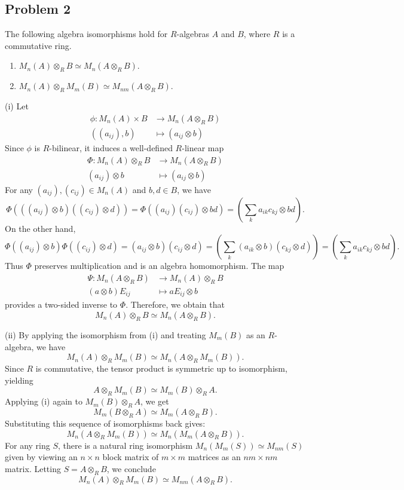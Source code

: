 \subsection*{Problem 2}
The following algebra isomorphisms hold for $R$-algebras $A$ and $B$, where $R$ is a commutative ring.
\begin{enumerate}
    \item[(i)] $M_n(A) \otimes_R B \simeq M_n(A \otimes_R B)$.
    \item[(ii)] $M_n(A) \otimes_R M_m(B) \simeq M_{nm}(A \otimes_R B)$.
\end{enumerate}
\begin{solution}
    (i) Let 
    \begin{align*}
        \phi : M_n(A) \times B &\to M_n(A \otimes_R B)\\
        ((a_{ij}), b)&\mapsto (a_{ij} \otimes b)
    \end{align*}
    Since $\phi$ is $R$-bilinear, it induces a well-defined $R$-linear map 
    \begin{align*}
        \Phi : M_n(A) \otimes_R B &\to M_n(A \otimes_R B)\\
        (a_{ij}) \otimes b &\mapsto (a_{ij} \otimes b)
    \end{align*}
    For any $(a_{ij}), (c_{ij}) \in M_n(A)$ and $b, d \in B$, we have$$\Phi(((a_{ij}) \otimes b)((c_{ij}) \otimes d)) = \Phi((a_{ij})(c_{ij}) \otimes bd) = \left(\sum_k a_{ik}c_{kj} \otimes bd\right).$$On the other hand,$$\Phi((a_{ij}) \otimes b)\Phi((c_{ij}) \otimes d) = (a_{ij} \otimes b)(c_{ij} \otimes d) = \left(\sum_k (a_{ik} \otimes b)(c_{kj} \otimes d)\right) = \left(\sum_k a_{ik}c_{kj} \otimes bd\right).$$Thus $\Phi$ preserves multiplication and is an algebra homomorphism. 
    The map 
    \begin{align*}
        \Psi: M_n(A \otimes_R B) &\to M_n(A) \otimes_R B \\
        (a \otimes b)E_{ij} &\mapsto aE_{ij} \otimes b
    \end{align*}
    provides a two-sided inverse to $\Phi$. Therefore, we obtain that $$M_n(A) \otimes_R B \simeq M_n(A \otimes_R B).$$
    
    (ii) By applying the isomorphism from (i) and treating $M_m(B)$ as an $R$-algebra, we have $$M_n(A) \otimes_R M_m(B) \simeq M_n(A \otimes_R M_m(B)).$$
     Since $R$ is commutative, the tensor product is symmetric up to isomorphism, yielding $$A \otimes_R M_m(B) \simeq M_m(B) \otimes_R A.$$ Applying (i) again to $M_m(B) \otimes_R A$, we get $$M_m(B \otimes_R A) \simeq M_m(A \otimes_R B).$$ Substituting this sequence of isomorphisms back gives:$$M_n(A \otimes_R M_m(B)) \simeq M_n(M_m(A \otimes_R B)).$$For any ring $S$, there is a natural ring isomorphism $M_n(M_m(S)) \simeq M_{nm}(S)$ given by viewing an $n \times n$ block matrix of $m \times m$ matrices as an $nm \times nm$ matrix. Letting $S = A \otimes_R B$, we conclude $$M_n(A) \otimes_R M_m(B) \simeq M_{nm}(A \otimes_R B).$$
\end{solution}


